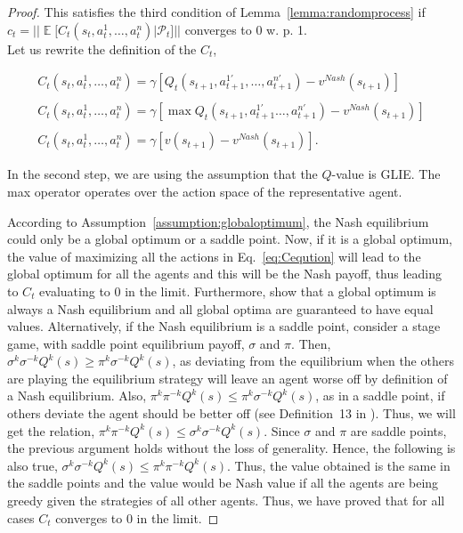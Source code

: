\documentclass[jair, twoside,11pt,theapa]{article}
\DeclareMathOperator{\E}{\mathbb{E}}
\begin{document}
\begin{proof}
\noindent This satisfies the third condition of Lemma~\ref{lemma:randomprocess} if $c_t = || \E[C_t(s_t,a_t^1,\ldots,a_t^n)|\mathscr{P}_t]|| $ converges to 0 w. p. 1. \\


Let us rewrite the definition of the $C_t$, 

\begin{equation}\label{eq:Ceqution}
\begin{array}{l}
   C_t(s_t,a_t^1,\ldots,a_t^n) =  \gamma[Q_t(s_{t+1}, a_{t+1}^{1'}, \ldots, a_{t+1}^{n'})  - v^{Nash}(s_{t+1})] \\ \\
   C_t(s_t,a_t^1,\ldots,a_t^n) =  \gamma[\max Q_t(s_{t+1}, a_{t+1}^{1'} \ldots, a_{t+1}^{n'}) -  v^{Nash}(s_{t+1})]
   \\  \\
   C_t(s_t,a_t^1,\ldots,a_t^n) =  \gamma[v(s_{t+1}) - v^{Nash}(s_{t+1})].
\end{array}
\end{equation}

In the second step, we are using the assumption that the $Q$-value is GLIE. The max operator operates over the action space of the representative agent. 

According to  Assumption~\ref{assumption:globaloptimum}, the Nash equilibrium could only be a global optimum or a saddle point. Now, if it is a global optimum, the value of maximizing all the actions in Eq.~\ref{eq:Ceqution} will lead to the global optimum for all the agents and this will be the Nash payoff, thus leading to $C_t$ evaluating to 0 in the limit. Furthermore, \citet{hu2003nash} show that a global optimum is always a Nash equilibrium and all global optima are guaranteed to have equal values. Alternatively, if the Nash equilibrium is a saddle point, consider a stage game, with saddle point equilibrium payoff, $\sigma$ and $\pi$. Then, $\sigma^k \sigma^{-k}Q^k(s) \geq \pi^k \sigma^{-k}Q^k(s) $, as deviating from the equilibrium when the others are playing the equilibrium strategy will leave an agent worse off by definition of a Nash equilibrium. Also,  $\pi^k \pi^{-k}Q^k(s) \leq \pi^k \sigma^{-k}Q^k(s)$, as in a saddle point, if others deviate the agent should be better off (see Definition~13 in \cite{hu2003nash}). Thus, we will get the relation, $\pi^k \pi^{-k}Q^k(s) \leq \sigma^k \sigma^{-k}Q^k(s)$. Since $\sigma$ and $\pi$ are saddle points, the previous argument holds without the loss of generality. Hence, the following is also true, $\sigma^k \sigma^{-k}Q^k(s) \leq \pi^k \pi^{-k}Q^k(s)$. Thus, the value obtained is the same in the saddle points and the value would be Nash value if all the agents are being greedy given the strategies of all other agents. Thus, we have proved that for all cases $C_t$ converges to 0 in the limit. 


\end{proof}
\end{document}
